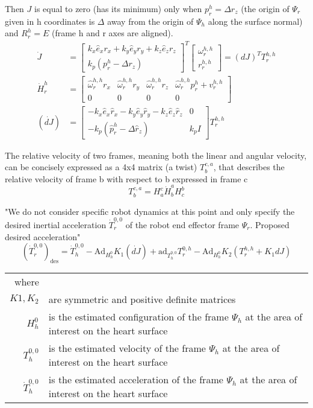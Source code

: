 Then $J$ is equal to zero (has its minimum) only when $p^h_r=\Delta r_z$ (the origin of $\Psi_r$ given in h coordinates is $\Delta$ away from the origin of $\Psi_h$ along the surface normal) and $R^h_r=E$ (frame h and r axes are aligned).
\begin{align}
	\dot{J} &= 
	\begin{bmatrix}
		k_x \hat{e}_x r_x + k_y \hat{e}_y r_y + k_z \hat{e}_z r_z\\
		k_p(p^h_r - \Delta r_z)
	\end{bmatrix}^T
	\begin{bmatrix}
		\omega^{h,h}_r \\
		r^{h,h}_r
	\end{bmatrix}
	= (dJ)^T T^{h,h}_r\\
	\dot{H}^h_r &= 
	\begin{bmatrix}
		\hat{\omega}^{h,h}_r r_x & \hat{\omega}^{h,h}_r r_y & \hat{\omega}^{h,h}_r r_z & \hat{\omega}^{h,h}_r p^h_r + v^{h,h}_r\\
		0 & 0 & 0 & 0
	\end{bmatrix}\\
	(\dot{dJ}) &=
	\begin{bmatrix}
		-k_x \hat{e}_x \hat{r}_x  - k_y \hat{e}_y \hat{r}_y - k_z \hat{e}_z \hat{r}_z & 0\\
		-k_p(\hat{p}^h_r - \Delta \hat{r}_z) & k_p I
	\end{bmatrix}
	T^{h,h}_r
\end{align}

The relative velocity of two frames, meaning both the linear and angular velocity, can be concisely expressed as a 4x4 matrix (a twist) $T^{c,a}_b$, that describes the relative velocity of frame b with respect to b expressed in frame c
\begin{equation}
T^{c,a}_b = H^c_a \dot{H}^a_b H^b_c
\end{equation}

"We do not consider specific robot dynamics at this point and only specify the desired inertial acceleration $\dot{T}^{0,0}_r$ of the robot end effector frame $\Psi_r$. Proposed desired acceleration"
\begin{equation}
\left(\dot{T}^{0,0}_r\right)_\text{des} = \dot{T}^{0,0}_h - \text{Ad}_{H^0_h} K_1 (\dot{dJ}) + \text{ad}_{T^{0,0}_h} T^{0,h}_r - \text{Ad}_{H^0_h} K_2 (T^{h,h}_r + K_1 dJ)
\end{equation}
\begin{tabular}{rl}
	where & \\
	$K1, K_2$ & are symmetric and positive definite matrices\\
	$H^0_h$ & is the estimated configuration of the frame $\Psi_h$ at the area of interest on the heart surface\\
	$T^{0,0}_h$ & is the estimated velocity of the frame $\Psi_h$ at the area of interest on the heart surface\\
	$\dot{T}^{0,0}_h$ & is the estimated acceleration of the frame $\Psi_h$ at the area of interest on the heart surface\\
\end{tabular}\\

